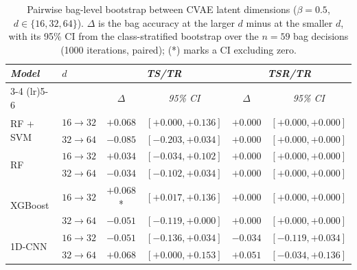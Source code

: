 \begin{table}[H]
\centering
\scriptsize
\begin{tabular*}{\textwidth}{@{\extracolsep{\fill}}llcccc}
\toprule
\multirow{2}{*}{\emph{Model}} & \multirow{2}{*}{\emph{$d$}} & \multicolumn{2}{c}{\emph{TS/TR}} & \multicolumn{2}{c}{\emph{TSR/TR}} \\
\cmidrule(lr){3-4} \cmidrule(lr){5-6}
 & & \emph{$\Delta$} & \emph{95\% CI} & \emph{$\Delta$} & \emph{95\% CI} \\
\midrule
\multirow{2}{*}{RF + SVM} & $16 \to 32$ & $+0.068$ & $[+0.000, +0.136]$ & $+0.000$ & $[+0.000, +0.000]$ \\
 & $32 \to 64$ & $-0.085$ & $[-0.203, +0.034]$ & $+0.000$ & $[+0.000, +0.000]$ \\
\midrule
\multirow{2}{*}{RF} & $16 \to 32$ & $+0.034$ & $[-0.034, +0.102]$ & $+0.000$ & $[+0.000, +0.000]$ \\
 & $32 \to 64$ & $-0.034$ & $[-0.102, +0.034]$ & $+0.000$ & $[+0.000, +0.000]$ \\
\midrule
\multirow{2}{*}{XGBoost} & $16 \to 32$ & $+0.068$* & $[+0.017, +0.136]$ & $+0.000$ & $[+0.000, +0.000]$ \\
 & $32 \to 64$ & $-0.051$ & $[-0.119, +0.000]$ & $+0.000$ & $[+0.000, +0.000]$ \\
\midrule
\multirow{2}{*}{1D-CNN} & $16 \to 32$ & $-0.051$ & $[-0.136, +0.034]$ & $-0.034$ & $[-0.119, +0.034]$ \\
 & $32 \to 64$ & $+0.068$ & $[+0.000, +0.153]$ & $+0.051$ & $[-0.034, +0.136]$ \\
\bottomrule
\end{tabular*}
\caption{\small Pairwise bag-level bootstrap between CVAE latent dimensions ($\beta=0.5$, $d\in\{16,32,64\}$). $\Delta$ is the bag accuracy at the larger $d$ minus at the smaller $d$, with its 95\% CI from the class-stratified bootstrap over the $n=59$ bag decisions (1000 iterations, paired); (*) marks a CI excluding zero.}
\label{tab:ctrl_boot_latent}
\end{table}

